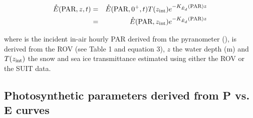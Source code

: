 \begin{linenomath*}
    \begin{eqnarray}
        \mathring{E}(\textnormal{PAR}, z, t) & = & \mathring{E}(\textnormal{PAR}, 0^+, t){}T(z_{\textnormal{int}})e^{-K_{\mathring{E}_d}(\textnormal{PAR}){}z} \\
        & = & \mathring{E}(\textnormal{PAR}, z_\textnormal{int})e^{-K_{\mathring{E}_d}(\textnormal{PAR}){}z} \nonumber
    \end{eqnarray}
\end{linenomath*}

\noindent where \eparzeroscalar{} is the incident in-air hourly PAR derived from the pyranometer (\micromol{}), \kdparscalar{} is derived from the ROV (see Table 1 and equation 3), $z$ the water depth (m) and $T(z_{\textnormal{int}})$ the snow and sea ice transmittance estimated using either the ROV or the SUIT data.

\subsection{Photosynthetic parameters derived from P vs. E curves}

